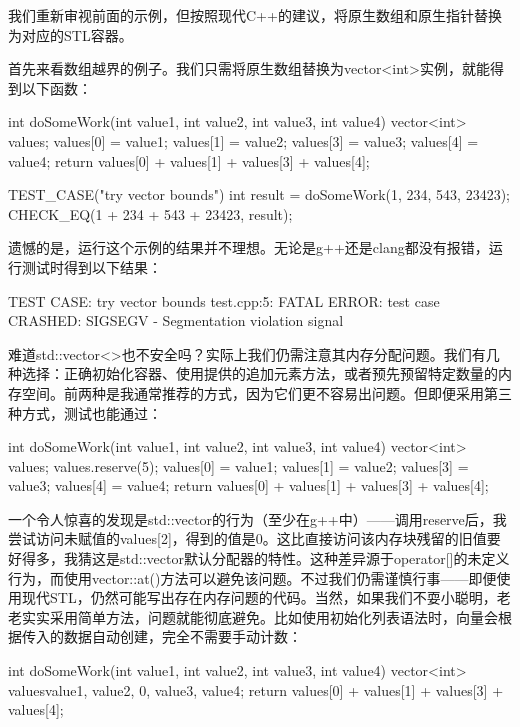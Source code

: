 
我们重新审视前面的示例，但按照现代C++的建议，将原生数组和原生指针替换为对应的STL容器。

首先来看数组越界的例子。我们只需将原生数组替换为vector<int>实例，就能得到以下函数：

\begin{cpp}
int doSomeWork(int value1, int value2, int value3, int value4) {
  vector<int> values;
  values[0] = value1;
  values[1] = value2;
  values[3] = value3;
  values[4] = value4;
  return values[0] + values[1] + values[3] + values[4];
}

TEST_CASE("try vector bounds"){
  int result = doSomeWork(1, 234, 543, 23423);
  CHECK_EQ(1 + 234 + 543 + 23423, result);
}
\end{cpp}

遗憾的是，运行这个示例的结果并不理想。无论是g++还是clang都没有报错，运行测试时得到以下结果：

\begin{shell}
TEST CASE: try vector bounds
test.cpp:5: FATAL ERROR: test case CRASHED: SIGSEGV - Segmentation violation signal
\end{shell}

难道std::vector<>也不安全吗？实际上我们仍需注意其内存分配问题。我们有几种选择：正确初始化容器、使用提供的追加元素方法，或者预先预留特定数量的内存空间。前两种是我通常推荐的方式，因为它们更不容易出问题。但即便采用第三种方式，测试也能通过：

\begin{cpp}
int doSomeWork(int value1, int value2, int value3, int value4) {
  vector<int> values;
  values.reserve(5);
  values[0] = value1;
  values[1] = value2;
  values[3] = value3;
  values[4] = value4;
  return values[0] + values[1] + values[3] + values[4];
}
\end{cpp}

一个令人惊喜的发现是std::vector的行为（至少在g++中）——调用reserve后，我尝试访问未赋值的values[2]，得到的值是0。这比直接访问该内存块残留的旧值要好得多，我猜这是std::vector默认分配器的特性。这种差异源于operator[]的未定义行为，而使用vector::at()方法可以避免该问题。不过我们仍需谨慎行事——即便使用现代STL，仍然可能写出存在内存问题的代码。当然，如果我们不耍小聪明，老老实实采用简单方法，问题就能彻底避免。比如使用初始化列表语法时，向量会根据传入的数据自动创建，完全不需要手动计数：

\begin{cpp}
int doSomeWork(int value1, int value2, int value3, int value4) {
  vector<int> values{value1, value2, 0, value3, value4};
  return values[0] + values[1] + values[3] + values[4];
}
\end{cpp}

